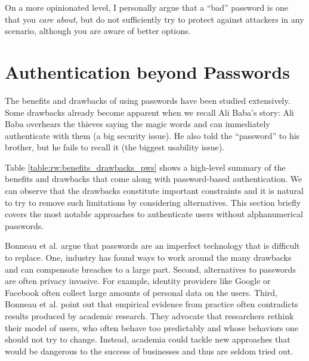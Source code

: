 On a more opinionated level, I personally argue that a ``bad'' password is one that you \textit{care about}, but do not sufficiently try to protect against attackers in any scenario, although you are aware of better options. 

\section{Authentication beyond Passwords}\label{sec:rw:authentication_without_pws}
The benefits and drawbacks of using passwords have been studied extensively. Some drawbacks already become apparent when we recall Ali Baba's story: Ali Baba overhears the thieves saying the magic words and can immediately authenticate with them (a big security issue). He also told the ``password'' to his brother, but he fails to recall it (the biggest usability issue).

Table \ref{table:rw:benefits_drawbacks_pws} shows a high-level summary of the benefits and drawbacks that come along with password-based authentication. We can observe that the drawbacks constitute important constraints and it is natural to try to remove such limitations by considering alternatives. This section briefly covers the most notable approaches to authenticate users without alphanumerical passwords.


Bonneau et al. argue \cite{Bonneau2015ImperfectAuthentication} that passwords are an imperfect technology that is difficult to replace. One, industry has found ways to work around the many drawbacks and can compensate breaches to a large part. Second, alternatives to passwords are often privacy invasive. For example, identity providers like Google or Facebook often collect large amounts of personal data on the users. Third, Bonneau et al. point out that empirical evidence from practice often contradicts results produced by academic research. They advocate that researchers rethink their model of users, who often behave too predictably and whose behaviors one should not try to change. Instead, academia could tackle new approaches that would be dangerous to the success of businesses and thus are seldom tried out. 


